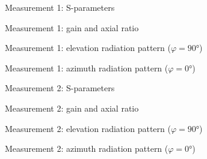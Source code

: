 \documentclass[11pt,a4paper,twoside,openany]{report}
\begin{document}
\newpage
\begin{figure}[!ht]
    \centering
    
    \caption{\label{fig:meas1-sparameters}Measurement 1: S-parameters}
\end{figure}

\begin{figure}[!ht]
    \centering
    
    \caption{\label{fig:meas1-boresight-radiation}Measurement 1: gain and axial ratio}
\end{figure}

\begin{figure}[!ht]
    \centering
    
    \caption{\label{fig:meas1-elevation-radiation}Measurement 1: elevation radiation pattern ($\varphi=\ang{90}$)}
\end{figure}

\begin{figure}[!ht]
    \centering
    
    \caption{\label{fig:meas1-azimuth-radiation}Measurement 1: azimuth radiation pattern ($\varphi=\ang{0}$)}
\end{figure}

\begin{figure}[!ht]
    \centering
    
    \caption{\label{fig:meas2-sparameters}Measurement 2: S-parameters}
\end{figure}

\begin{figure}[!ht]
    \centering
    
    \caption{\label{fig:meas2-boresight-radiation}Measurement 2: gain and axial ratio}
\end{figure}

\begin{figure}[!ht]
    \centering
    
    \caption{\label{fig:meas2-elevation-radiation}Measurement 2: elevation radiation pattern ($\varphi=\ang{90}$)}
\end{figure}

\begin{figure}[!ht]
    \centering
    
    \caption{\label{fig:meas2-azimuth-radiation}Measurement 2: azimuth radiation pattern ($\varphi=\ang{0}$)}
\end{figure}


\printbibliography[heading=bibintoc]

\end{document}
